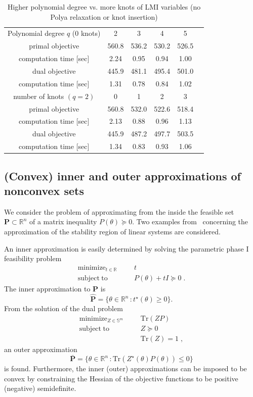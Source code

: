 \documentclass{article}
\DeclareMathOperator*{\minimize}{minimize}
\DeclareMathOperator*{\subj}{subject\;to}
\newcommand{\R}{\mathbb{R}}         %
\renewcommand{\S}{\mathbb{S}}       %
\newcommand{\Tr}{\mathrm{Tr}}       %
\newcommand{\opt}{\star}                    %
\newcommand{\ppar}{\theta}                          %
\begin{document}
\begin{table}
	\centering
	\caption{Higher polynomial degree vs. more knots of LMI variables (no Polya relaxation or knot insertion)} \vspace{0.2cm}
	\label{tab:incdeg_knot}
	\begin{tabular}{cccccc}
		\toprule
	  Polynomial degree $q$ (0 knots) & 2     & 3     & 4     & 5     \\
	  primal objective                & 560.8 & 536.2 & 530.2 & 526.5 \\
	  computation time [sec]  	      & 2.24  & 0.95  & 0.94  & 1.00  \\
	  dual objective          	      & 445.9 & 481.1 & 495.4 & 501.0 \\
	  computation time [sec]  	      & 1.31  & 0.78  & 0.84  & 1.02  \\
	  \midrule
	  number of knots $(q = 2)$       & 0     & 1     & 2     & 3     \\
	  primal objective                & 560.8 & 532.0 & 522.6 & 518.4 \\
	  computation time [sec]          & 2.13  & 0.88  & 0.96  & 1.13  \\
	  dual objective                  & 445.9 & 487.2 & 497.7 & 503.5 \\
	  computation time [sec]          & 1.34  & 0.83  & 0.93  & 1.06  \\
		\bottomrule
	\end{tabular}
\end{table}


\subsection{(Convex) inner and outer approximations of nonconvex sets}
We consider the problem of approximating from the inside the feasible set $
\mathbf{P} \subset \R^n$ of a matrix inequality $P(\ppar) \succeq 0$. Two examples
from~\cite{Henrion_Lasserre_2012} concerning the approximation of the stability region of linear
systems are considered.

An inner approximation is easily determined by solving the parametric phase I feasibility
problem
\[
\begin{aligned}
\minimize_{t\in\R} &&& t \\
\subj              &&& P(\theta) + tI \succeq 0 \; .%
\end{aligned}
\]
The inner approximation to $\mathbf{P}$ is
\[
\mathbf{\hat{P}} = \{\ppar \in \R^n \, : t^\opt(\ppar) \geq 0 \}.
\]
From the solution of the dual problem
\[
\begin{aligned}
\minimize_{Z\in \S^m} &&& \Tr(ZP) \\
\subj              &&& Z \succeq 0 \\
                   &&& \Tr(Z) = 1 \; ,%
\end{aligned}
\]
an outer approximation
\[
\mathbf{\bar{P}} = \{\ppar \in \R^n \, : \Tr(Z^\opt(\ppar) P(\ppar)) \leq 0 \}
\]
is found.
Furthermore, the inner (outer) approximations can be imposed to be convex
by constraining the Hessian of the objective functions to be positive (negative)
semidefinite.
\end{document}
